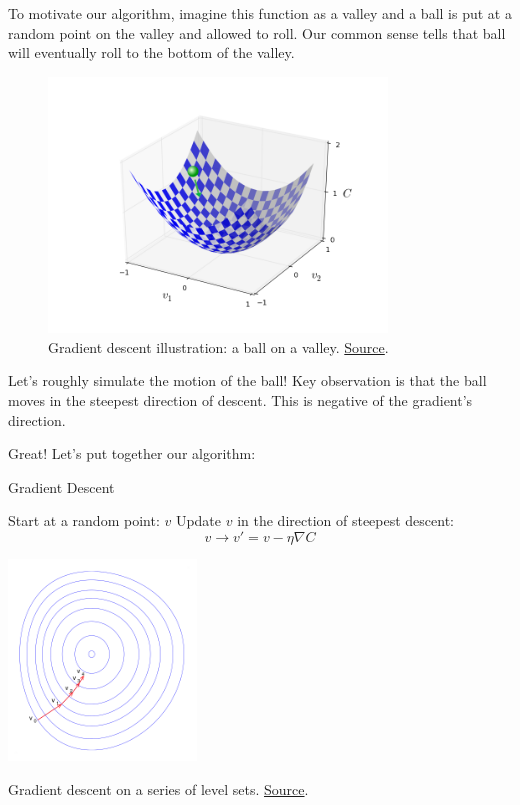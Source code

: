 \documentclass[a4paper]{tufte-handout}
\begin{document}
To motivate our algorithm, imagine this function as a valley and a ball
is put at a random point on the valley and allowed to roll. Our common
sense tells that ball will eventually roll to the bottom of the valley.

\begin{figure}
  \includegraphics[width=90mm]{valley_with_ball}
  \caption{Gradient descent illustration: a ball on a valley.
\href{http://neuralnetworksanddeeplearning.com/chap1.html}{Source}.}
\end{figure}

Let's roughly simulate the motion of the ball! Key observation is that
the ball moves in the steepest direction of descent. This is negative
of the gradient's direction.

Great! Let's put together our algorithm:

\begin{algorithm}
\caption{Gradient Descent}
\begin{algorithmic}[1]
  \STATE Start at a random point: \(v\)
  \STATE Update \(v\) in the direction of steepest descent: 
      \[v \rightarrow v' = v -\eta \nabla C\]
  \ENDWHILE
\end{algorithmic}
\end{algorithm}

\begin{marginfigure}[-10mm]
  \includegraphics[width=50mm]{Gradient_descent}
  \caption{Gradient descent on a series of level sets.
  \href{https://en.wikipedia.org/wiki/Gradient_descent}{Source}.}
\end{marginfigure}
\end{document}
